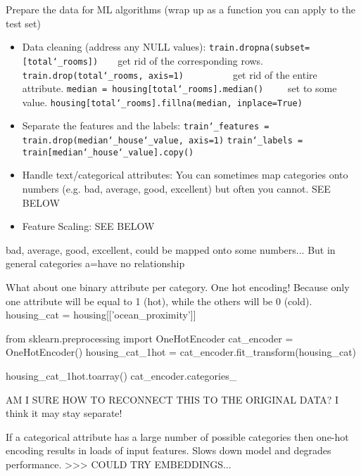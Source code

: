 Prepare the data for ML algorithms (wrap up as a function you can apply to the test set)
\vspace{-3.0mm}
\begin{itemize}
\item
Data cleaning (address any NULL values):\newline
\texttt{train.dropna(subset=[\textquotesingle total\char`_rooms\textquotesingle])}~~~~get rid of the corresponding rows.\newline
\texttt{train.drop(\textquotesingle total\char`_rooms\textquotesingle, axis=1)}~~~~~~~~~~get rid of the entire attribute.\newline
\texttt{median = housing[\textquotesingle total\char`_rooms\textquotesingle].median()}~~~~~set to some value.\newline
\texttt{housing[\textquotesingle total\char`_rooms\textquotesingle].fillna(median, inplace=True)}
\item
Separate the features and the labels:\newline
\texttt{train\char`_features = train.drop(\textquotesingle median\char`_house\char`_value\textquotesingle, axis=1)}\newline
\texttt{train\char`_labels = train[\textquotesingle median\char`_house\char`_value\textquotesingle].copy()}
\item
Handle text/categorical attributes:\newline
You can sometimes map categories onto numbers (e.g. bad, average, good, excellent)
but often you cannot.
SEE BELOW
\item
Feature Scaling:\newline
SEE BELOW
\end{itemize}


bad, average, good, excellent, could be mapped onto some numbers...
But in general categories a=have no relationship

What about one binary attribute per category. One hot encoding!
Because only one attribute will be equal to 1 (hot), while the others will be 0 (cold).
housing_cat = housing[['ocean_proximity']]

from sklearn.preprocessing import OneHotEncoder
cat_encoder = OneHotEncoder()
housing_cat_1hot = cat_encoder.fit_transform(housing_cat)

housing_cat_1hot.toarray()
cat_encoder.categories_

AM I SURE HOW TO RECONNECT THIS TO THE ORIGINAL DATA?
I think it may stay separate!


If a categorical attribute has a large number of possible categories
then one-hot encoding results in loads of input features.
Slows down model and degrades performance.
>>> COULD TRY EMBEDDINGS...

